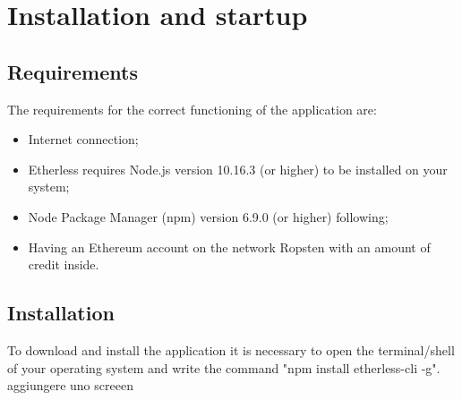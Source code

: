 \section{Installation and startup}
\subsection{Requirements}
The requirements for the correct functioning of the application are:
\begin{itemize}
	\item Internet connection;
	\item Etherless requires Node.js version 10.16.3 (or higher) to be installed on your system;
	\item Node Package Manager (npm) version 6.9.0 (or higher) following;
	\item Having an Ethereum account on the network Ropsten with an amount of credit inside.
\end{itemize}
\subsection{Installation}
To download and install the application it is necessary to open the terminal/shell of your operating system and write the command  "npm install etherless-cli -g".\\
aggiungere uno screeen


